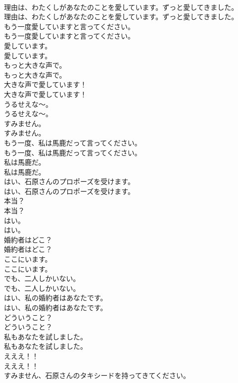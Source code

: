 \documentclass[8pt]{extreport}
\begin{document}
\begin{CJK}{UTF8}{min}
\\	理由は、わたくしがあなたのことを愛しています。ずっと愛してきました。	
\\	理由は、わたくしがあなたのことを愛しています。ずっと愛してきました。 
\\	もう一度愛していますと言ってください。	
\\	もう一度愛していますと言ってください。 
\\	愛しています。	
\\	愛しています。 
\\	もっと大きな声で。	
\\	もっと大きな声で。 
\\	大きな声で愛しています！	
\\	大きな声で愛しています！ 
\\	うるせえな～。	
\\	うるせえな～。 
\\	すみません。	
\\	すみません。 
\\	もう一度、私は馬鹿だって言ってください。	
\\	もう一度、私は馬鹿だって言ってください。 
\\	私は馬鹿だ。	
\\	私は馬鹿だ。 
\\	はい、石原さんのプロポーズを受けます。	
\\	はい、石原さんのプロポーズを受けます。 
\\	本当？	
\\	本当？ 
\\	はい。	
\\	はい。 
\\	婚約者はどこ？	
\\	婚約者はどこ？ 
\\	ここにいます。	
\\	ここにいます。 
\\	でも、二人しかいない。	
\\	でも、二人しかいない。 
\\	はい、私の婚約者はあなたです。	
\\	はい、私の婚約者はあなたです。 
\\	どういうこと？	
\\	どういうこと？ 
\\	私もあなたを試しました。	
\\	私もあなたを試しました。 
\\	えええ！！	
\\	えええ！！ 
\\	すみません、石原さんのタキシードを持ってきてください。	

\end{CJK}
\end{document}
